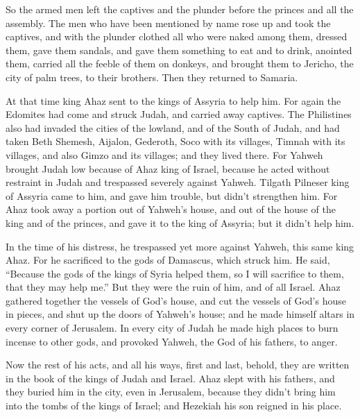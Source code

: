 {\par }{\PP {}So the armed men left the captives and the plunder before the princes and all the assembly.
The men who have been mentioned by name rose up and took the captives, and with the plunder clothed all who were naked among them, dressed them, gave them sandals, and gave them something to eat and to drink, anointed them, carried all the feeble of them on donkeys, and brought them to Jericho, the city of palm trees, to their brothers. Then they returned to Samaria.
\par }{\PP {}At that time king Ahaz sent to the kings of Assyria to help him.
For again the Edomites had come and struck Judah, and carried away captives.
The Philistines also had invaded the cities of the lowland, and of the South of Judah, and had taken Beth Shemesh, Aijalon, Gederoth, Soco with its villages, Timnah with its villages, and also Gimzo and its villages; and they lived there.
For Yahweh brought Judah low because of Ahaz king of Israel, because he acted without restraint in Judah and trespassed severely against Yahweh.
Tilgath Pilneser king of Assyria came to him, and gave him trouble, but didn’t strengthen him.
For Ahaz took away a portion out of Yahweh’s house, and out of the house of the king and of the princes, and gave it to the king of Assyria; but it didn’t help him.
\par }{\PP {}In the time of his distress, he trespassed yet more against Yahweh, this same king Ahaz.
For he sacrificed to the gods of Damascus, which struck him. He said, “Because the gods of the kings of Syria helped them, so I will sacrifice to them, that they may help me.” But they were the ruin of him, and of all Israel.
Ahaz gathered together the vessels of God’s house, and cut the vessels of God’s house in pieces, and shut up the doors of Yahweh’s house; and he made himself altars in every corner of Jerusalem.
In every city of Judah he made high places to burn incense to other gods, and provoked Yahweh, the God of his fathers, to anger.
\par }{\PP {}Now the rest of his acts, and all his ways, first and last, behold, they are written in the book of the kings of Judah and Israel.
Ahaz slept with his fathers, and they buried him in the city, even in Jerusalem, because they didn’t bring him into the tombs of the kings of Israel; and Hezekiah his son reigned in his place.

}
